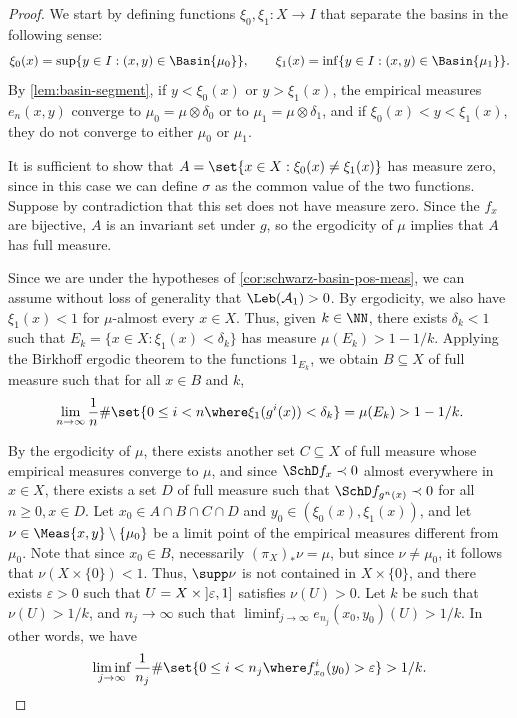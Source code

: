 \documentclass[../main]{subfiles}
\begin{document}
\begin{proof}
  We start by defining functions \(\xi_0, \xi_1 \colon X \to I\) that separate the basins in the following sense:
  \begin{equation*}
    \xi_0(x) = \sup \{ y \in I : (x,y) \in \Basin{\mu_0} \}, \qquad \xi_1(x) = \inf \{ y \in I : (x,y) \in \Basin{\mu_1} \}.
  \end{equation*}
  By \cref{lem:basin-segment}, if \(y < \xi_0(x)\) or \(y > \xi_1(x)\), the empirical measures \(e_n(x,y)\) converge to \(\mu_0 = \mu \otimes \delta_0\) or to \(\mu_1 = \mu \otimes \delta_1\), and if \(\xi_0(x) < y < \xi_1(x)\), they do not converge to either \(\mu_0\) or \(\mu_1\).
  
  It is sufficient to show that \(A = \set{ x \in X : \xi_0(x) \neq \xi_1(x) }\) has measure zero, since in this case we can define \(\sigma\) as the common value of the two functions. Suppose by contradiction that this set does not have measure zero. Since the \(f_x\) are bijective, \(A\) is an invariant set under \(g\), so the ergodicity of \(\mu\) implies that \(A\) has full measure.

  Since we are under the hypotheses of \cref{cor:schwarz-basin-pos-meas}, we can assume without loss of generality that \(\Leb(\mathcal{A}_1) > 0\). By ergodicity, we also have \(\xi_1(x) < 1\) for \(\mu\)-almost every \(x \in X\). Thus, given \(k \in \NN\), there exists \(\delta_k < 1\) such that \(E_k = \{ x \in X : \xi_1(x) < \delta_k \}\) has measure \(\mu(E_k) > 1 - 1/k\). Applying the Birkhoff ergodic theorem to the functions \(1_{E_k}\), we obtain \(B \subseteq X\) of full measure such that for all \(x \in B\) and \(k\),
  \begin{equation}\label{eq:time-small}
    \lim_{n \to \infty} \frac{1}{n} \# \set{ 0 \leq i < n \where \xi_1(g^i(x)) < \delta_k} = \mu(E_{k}) > 1 - 1/k.
  \end{equation}
  
  By the ergodicity of \(\mu\), there exists another set \(C \subseteq X\) of full measure whose empirical measures converge to \(\mu\), and since \(\SchD f_x \prec 0\) almost everywhere in \(x \in X\), there exists a set \(D\) of full measure such that \(\SchD f_{g^n(x)} \prec 0\) for all \(n \geq 0, x \in D\). Let \(x_0 \in A \cap B \cap C \cap D\) and \(y_0 \in (\xi_0(x), \xi_1(x))\), and let \(\nu \in \Meas{x,y} \setminus \{ \mu_0 \}\) be a limit point of the empirical measures different from \(\mu_0\). Note that since \(x_0 \in B\), necessarily \((\pi_X)_* \nu = \mu\), but since \(\nu \neq \mu_0\), it follows that \(\nu(X \times \{ 0 \}) < 1\). Thus, \(\supp \nu\) is not contained in \(X \times \{ 0 \}\), and there exists \(\varepsilon > 0\) such that \(U = X \times \interval[open left]{\varepsilon}{1}\) satisfies \(\nu(U) > 0\). Let \(k\) be such that \(\nu(U) > 1/k\), and \(n_j \to \infty\) such that \(\liminf_{j \to \infty} e_{n_j}(x_0,y_0)(U) > 1/k\).
  In other words, we have
  \begin{equation}\label{eq:time-big}
    \liminf_{j \to \infty} \frac{1}{n_j} \# \set{ 0 \leq i < n_j \where f_{x_0}^i(y_0) > \varepsilon} > 1/k.
  \end{equation}


\end{proof}
\end{document}
